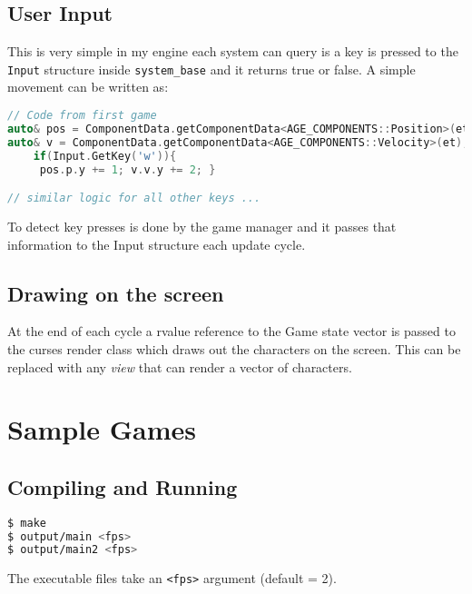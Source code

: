 \documentclass[16pt,a4paper]{article}
\begin{document}
\subsection{User Input}  
This is very simple in my engine each system can query is a key is pressed to the \texttt{Input} structure inside \texttt{system\_base} and it returns true or false.
 A simple movement can be written as:
\begin{lstlisting}[language=c++]
// Code from first game
auto& pos = ComponentData.getComponentData<AGE_COMPONENTS::Position>(et);
auto& v = ComponentData.getComponentData<AGE_COMPONENTS::Velocity>(et);            
    if(Input.GetKey('w')){         
     pos.p.y += 1; v.v.y += 2; }

// similar logic for all other keys ...
\end{lstlisting}
To detect key presses is done by the game manager and it passes that information to the Input structure each update cycle. 

\subsection{Drawing on the screen}
At the end of each cycle a rvalue reference to the Game state vector is passed to the curses render class which draws out the characters on the screen. This can be replaced with any \textit{view} that can render a vector of characters. 

\section{Sample Games}
\subsection{Compiling and Running}
\begin{lstlisting}[language=bash]
$ make
$ output/main <fps>
$ output/main2 <fps>
\end{lstlisting}
The executable files take an \texttt{<fps>} argument (default = 2).   
\end{document}
